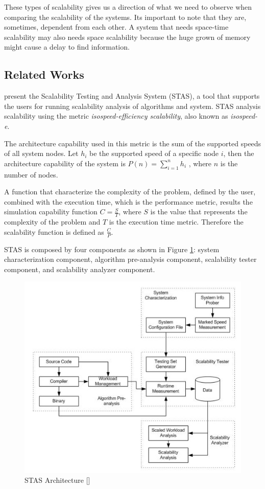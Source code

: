 These types of scalability gives us a direction of what we need to observe when comparing the scalability of the systems. Its important to note that they are, sometimes, dependent from each other. A system that needs space-time scalability may also needs space scalability because the huge grown of memory might cause a delay to find information.

\subsection{Related Works}

\cite{STAS} present the Scalability Testing and Analysis System (STAS), a tool that supports the users for running scalability analysis of algorithms and system. STAS analysis scalability using the metric \emph{isospeed-efficiency scalability}, also known as \emph{isospeed-e}. 

The architecture capability used in this metric is the sum of the supported speeds of all system nodes. Let $h_{i}$ be the supported speed of a specific node $i$, then the architecture capability of the system is $P(n) = \sum_{i=1}^{n} h_i$ , where $n$ is the number of nodes. 

A function that characterize the complexity of the problem, defined by the user, combined with the execution time, which is the performance metric, results the simulation capability function $C = \frac{S}{T}$, where $S$ is the value that represents the complexity of the problem and $T$ is the execution time metric. Therefore the scalability function is defined as $\frac{C}{P}$.

STAS is composed by four components as shown in Figure \ref{stasarchitecture}: system characterization component, algorithm pre-analysis component, scalability tester component, and scalability analyzer component.

\begin{figure}[htbp]
\begin{center}
	\includegraphics[scale=0.6]{images/stasarchitecture}
\caption{STAS Architecture [\cite{STAS}]}
\label{stasarchitecture}
\end{center}
\end{figure}

